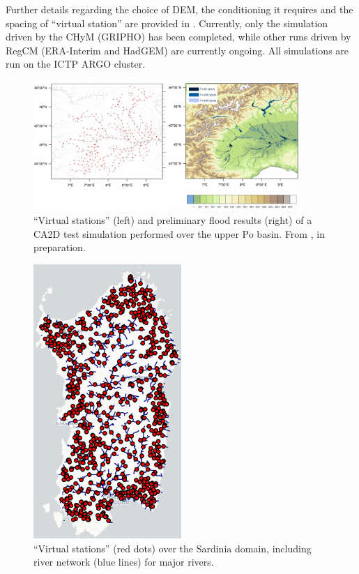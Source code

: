 Further details regarding the choice of DEM, the conditioning it requires and the spacing of ``virtual station'' are provided in \citet[][in preparation]{Nogherotto2018}.
Currently, only the simulation driven by the CHyM (GRIPHO) has been completed, while other runs driven by RegCM (ERA-Interim and HadGEM) are currently ongoing.
All simulations are run on the ICTP ARGO cluster.
\begin{figure}
    \centering
    \includegraphics[width=0.9\textwidth]{figures/valid_flood/overlay_chym_locations.png}
    \decoRule
    \caption[``Virtual stations'' and preliminary results of a CA2D simulations over the upper Po basin]{``Virtual stations'' (left) and preliminary flood results (right) of a CA2D test simulation performed over the upper Po basin. From \citet{Nogherotto2018}, in preparation.}
    \label{fig:ca2d_fakestations}
\end{figure}
\begin{figure}
    \centering
    \includegraphics[width=0.5\textwidth]{figures/valid_flood/method/Sardinia}
    \decoRule
    \caption[``Virtual stations'' example over the Sardinia domain]{``Virtual stations'' (red dots) over the Sardinia domain, including river network (blue lines) for major rivers.}
    \label{fig:ca2d_fakestations2}
\end{figure}

